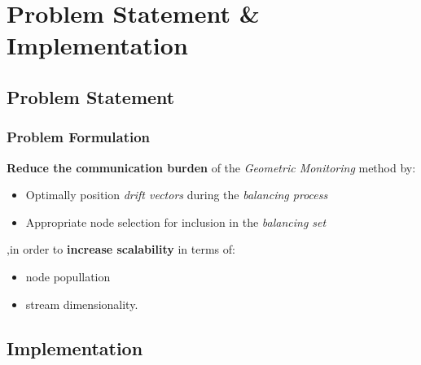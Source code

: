 \documentclass[hyperref={pdfpagelabels=false}]{beamer}
\begin{document}
\section{Problem Statement \& Implementation}
\begin{frame}
  \tableofcontents[currentsection]
\end{frame}
 
\subsection{Problem Statement}
\begin{frame} \frametitle{Problem Formulation}
\textbf{Reduce the communication burden} of the \emph{Geometric Monitoring} method by:
\begin{itemize}
\item Optimally position \emph{drift vectors} during the \emph{balancing process}
\item Appropriate node selection for inclusion in the \emph{balancing set}
\end{itemize}
,in order to \textbf{increase scalability} in terms of:
\begin{itemize}
\item node popullation
\item stream dimensionality.
\end{itemize}
\end{frame}
\subsection{Implementation}
\end{document}

